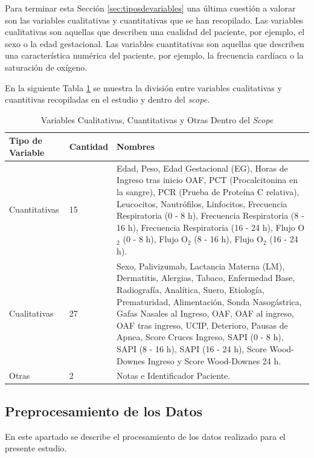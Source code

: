 Para terminar esta Sección \ref{sec:tiposdevariables} una última cuestión a valorar son las variables cualitativas y cuantitativas que se han recopilado. Las variables cualitativas son aquellas que describen una cualidad del paciente, por ejemplo, el sexo o la edad gestacional. Las variables cuantitativas son aquellas que describen una característica numérica del paciente, por ejemplo, la frecuencia cardíaca o la saturación de oxígeno.

En la siguiente Tabla \ref{tabla:cuali_cuanti} se muestra la división entre variables cualitativas y cuantitivas recopiladas en el estudio y dentro del \textit{scope}.

\begin{table}[H]
    \centering
        \begin{tabular}{| m{5cm} | m{1.75cm} | m{7cm} |}
            \hline Tipo de Variable & Cantidad & Nombres  \\ \hline
            Cuantitativas & 15 & Edad, Peso, Edad Gestacional (EG), Horas de Ingreso tras inicio OAF, PCT (Procalcitonina en la sangre), PCR (Prueba de Proteína C relativa), Leucocitos, Nautrófilos, Linfocitos, Frecuencia Respiratoria (0 - 8 h), Frecuencia Respiratoria (8 - 16 h),
            Frecuencia Respiratoria (16 - 24 h),
            Flujo O$_2$ (0 - 8 h),
            Flujo O$_2$ (8 - 16 h),
            Flujo O$_2$ (16 - 24 h). \\ \hline
            Cualitativas & 27 & Sexo, Palivizumab, Lactancia Materna (LM), Dermatitis, Alergias, Tabaco, Enfermedad Base, Radiografía, Analítica, Suero, Etiología, Prematuridad, Alimentación, Sonda Nasogástrica, Gafas Nasales al Ingreso, OAF, OAF al ingreso, OAF tras ingreso, UCIP, Deterioro, Pausas de Apnea, Score Cruces Ingreso, SAPI (0 - 8 h),
            SAPI (8 - 16 h), 
            SAPI (16 - 24 h), Score Wood-Downes Ingreso y Score Wood-Downes 24 h. \\ \hline
            Otras & 2 & Notas e Identificador Paciente. \\ \hline
        \end{tabular}
    \caption{Variables Cualitativas, Cuantitativas y Otras Dentro del \textit{Scope}}\label{tabla:cuali_cuanti}
\end{table}

\subsection{Preprocesamiento de los Datos}

En este apartado se describe el procesamiento de los datos realizado para el presente estudio.

